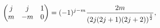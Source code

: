 \[\begin{pmatrix}j&j&1\\
m&-m&0\end{pmatrix}=(-1)^{j-m}\frac{2m}{\left(2j(2j+1)(2j+2)\right)^{\frac{1}{%
2}}},\]
